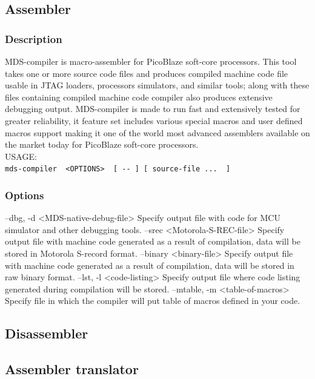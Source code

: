     \subsection{Assembler}
        \subsubsection{Description}
        MDS-compiler is macro-assembler for PicoBlaze soft-core processors. This tool takes one or more source code files and produces compiled machine code file usable in JTAG loaders, processors
        simulators, and similar tools; along with these files containing compiled machine code compiler also produces extensive debugging
        output. MDS-compiler is made to run fast and extensively tested for greater reliability, it feature set includes various special
        macros and user defined macros support making it one of the world most advanced assemblers available on the market today for PicoBlaze
        soft-core processors.\\

        USAGE:
        {
            ~\\
            \usecodefont
            \verb'mds-compiler  <OPTIONS>  [ -- ] [ source-file ...  ]'\\
        }
        \subsubsection{Options}

            --dbg, -d <MDS-native-debug-file>
            Specify output file with code for MCU simulator and other debugging tools.
            --srec <Motorola-S-REC-file>
            Specify output file with machine code generated as a result of compilation, data will be stored in Motorola S-record format.
            --binary <binary-file>
            Specify output file with machine code generated as a result of compilation, data will be stored in raw binary format.
            --lst, -l <code-listing>
            Specify output file where code listing generated during compilation will be stored.
            --mtable, -m <table-of-macros>
            Specify file in which the compiler will put table of macros defined in your code.

    \subsection{Disassembler}
    \subsection{Assembler translator}












    